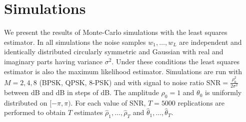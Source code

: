 \documentclass[journal]{IEEEtran}
\begin{document}


\section{Simulations}\label{sec:simulations}

We present the results of Monte-Carlo simulations with the least squares estimator.  In all simulations the noise samples $w_1,\dots,w_L$ are independent and identically distributed circularly symmetric and Gaussian with real and imaginary parts having variance $\sigma^2$.  Under these conditions the least squares estimator is also the maximum likelihood estimator.  Simulations are run with $M=2,4,8$ (BPSK, QPSK, $8$-PSK) and with signal to noise ratio $\text{SNR} = \tfrac{\rho_0^2}{2\sigma^2}$ between \unit[-20]{dB} and \unit[20]{dB} in steps of \unit[1]{dB}.  The amplitude $\rho_0=1$ and $\theta_0$ is uniformly distributed on $[-\pi, \pi)$.  For each value of SNR, $T = 5000$ replications are performed to obtain $T$ estimates $\hat{\rho}_1, \dots, \hat{\rho}_T$ and $\hat{\theta}_1, \dots, \hat{\theta}_T$.  
\end{document}
